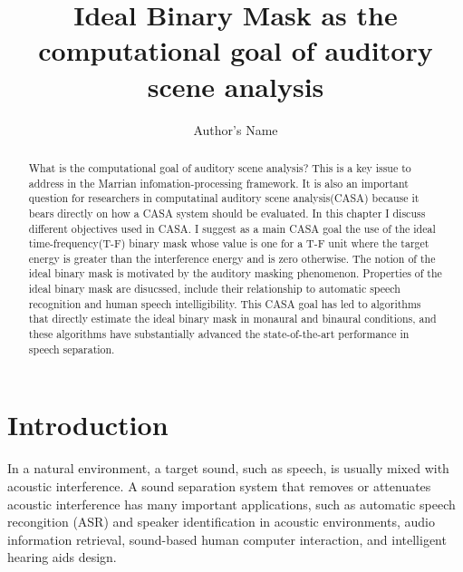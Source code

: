 \documentclass{article}
\begin{document}
\title{Ideal Binary Mask as the computational goal of auditory scene analysis }
\author{Author's Name}

\maketitle

\begin{abstract}
What is the computational goal of auditory scene analysis? This is a key issue to address in the Marrian infomation-processing framework. It is also an important question for researchers in computatinal auditory scene analysis(CASA) because it bears directly on how a CASA system should be evaluated. In this chapter I discuss different objectives used in CASA. I suggest as a main CASA goal the use of the ideal time-frequency(T-F) binary mask whose value is one for a T-F unit where the target energy is greater than the interference energy and is zero otherwise. The notion of the ideal binary mask is motivated by the auditory masking phenomenon. Properties of the ideal binary mask are disucssed, include their relationship to automatic speech recognition and human speech intelligibility. This CASA goal has led to algorithms that directly estimate the ideal binary mask in monaural and binaural conditions, and these algorithms have substantially advanced the state-of-the-art performance in speech separation. 
\end{abstract}

\section{Introduction}
In a natural environment, a target sound, such as speech, is usually mixed with acoustic interference. A sound separation system that removes or attenuates acoustic interference has many important applications, such as automatic speech recongition (ASR) and speaker identification in acoustic environments, audio information retrieval, sound-based human computer interaction, and intelligent hearing aids design.
\end{document}
